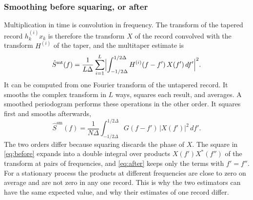 \documentclass[10pt,twocolumn]{article}
\newcommand{\dd}{\,d}
\begin{document}
\subsubsection{Smoothing before squaring, or after}
\label{sec:beforeafter}
Multiplication in time is convolution in frequency. The transform of the tapered record $h^{(i)}_kx_k$ is therefore the transform $X$ of the record convolved with the transform $H^{(i)}$ of the taper, and the multitaper estimate is
\begin{equation}
\hat S^{\mathrm{mt}}(f)=\frac{1}{L\Delta}\sum_{i=1}^{L}\Bigl|\int_{-1/2\Delta}^{1/2\Delta}H^{(i)}(f-f')\,X(f')\dd f'\Bigr|^2 .
\label{eq:before}
\end{equation}
It can be computed from one Fourier transform of the untapered record. It smooths the complex transform in $L$ ways, squares each result, and averages. A smoothed periodogram performs these operations in the other order. It squares first and smooths afterwards,
\begin{equation}
\hat S^{\mathrm{sm}}(f)=\frac{1}{N\Delta}\int_{-1/2\Delta}^{1/2\Delta}G(f-f')\,|X(f')|^2\dd f' .
\label{eq:after}
\end{equation}
The two orders differ because squaring discards the phase of $X$. The square in \eqref{eq:before} expands into a double integral over products $X(f')X^{*}(f'')$ of the transform at pairs of frequencies, and \eqref{eq:after} keeps only the terms with $f'=f''$. For a stationary process the products at different frequencies are close to zero on average and are not zero in any one record. This is why the two estimators can have the same expected value, and why their estimates of one record differ.
\end{document}
